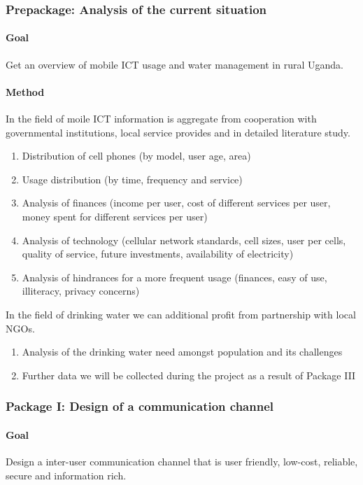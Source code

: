 \documentclass[11pt]{article}
\begin{document}
\subsubsection*{Prepackage: Analysis of the current situation}
\paragraph{Goal} Get an overview of mobile ICT usage and water management in rural Uganda.
\paragraph{Method}
In the field of moile ICT information is aggregate from cooperation with governmental institutions, local service provides and in detailed literature study.
\begin{enumerate}
 \item Distribution of cell phones (by model, user age, area)
 \item Usage distribution (by time, frequency and service)
 \item Analysis of finances (income per user, cost of different services per user, money spent for different services per user)
 \item Analysis of technology (cellular network standards, cell sizes, user per cells, quality of service, future investments, availability of electricity)
 \item Analysis of hindrances for a more frequent usage (finances, easy of use, illiteracy, privacy concerns)
\end{enumerate}
In the field of drinking water we can additional profit from partnership with local NGOs.
\begin{enumerate}
 \item Analysis of the drinking water need amongst population and its challenges
 \item Further data we will be collected during the project as a result of Package III
\end{enumerate}


\subsubsection*{Package I: Design of a communication channel}
\paragraph{Goal} Design a inter-user communication channel that is user friendly, low-cost, reliable, secure and information rich.
\end{document}

